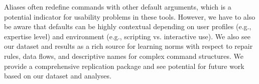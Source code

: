 \documentclass[smallextended,natbib]{svjour3}
\begin{document}
Aliases often redefine commands with other default arguments, which is a potential indicator for usability problems in these tools.
However, we have to also be aware that defaults can be highly contextual depending on user profiles (e.g., expertise level) and environment (e.g., scripting vs. interactive use).
We also see our dataset and results as a rich source for learning norms with respect to repair rules, data flows, and descriptive names for complex command structures.
We provide a comprehensive replication package and see potential for future work based on our dataset and analyses.



\end{document}
